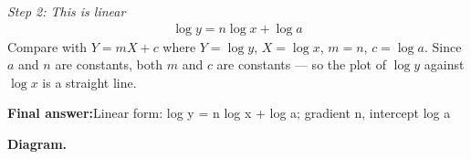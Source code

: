 \documentclass[11pt]{article}
\begin{document}
\textit{Step 2: This is linear}
\[\begin{gathered}
\log y = n\log x + \log a
\end{gathered}\]
Compare with \( Y = mX + c \) where \( Y = \log y \), \( X = \log x \), \( m = n \), \( c = \log a \). Since \( a \) and \( n \) are constants, both \( m \) and \( c \) are constants --- so the plot of \( \log y \) against \( \log x \) is a straight line.

\begin{answerbox}
\textbf{Final answer:}\quad Linear form: log y = n log x + log a; gradient n, intercept log a
\end{answerbox}
\textbf{Diagram.}

\begin{center}
\end{center}
\end{document}
